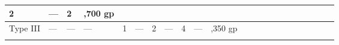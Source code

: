 \begin{longtable}{llllllllllllllllllllll}
{\begin{minipage}[t]{0.287in}
2\end{minipage}} & \multicolumn{1}{p{0.287in}|}{\begin{minipage}[t]{0.287in}\raggedright
---\end{minipage}} & \multicolumn{1}{p{0.287in}|}{\begin{minipage}[t]{0.287in}\raggedright
2\end{minipage}} & \multicolumn{1}{p{0.736in}|}{\begin{minipage}[t]{0.736in}\raggedleft
2,700 gp\end{minipage}}\\
\hline
\multicolumn{1}{p{0.054in}|}{\begin{minipage}[t]{0.054in}\raggedleft
Type III\end{minipage}} & \multicolumn{1}{p{0.054in}|}{\begin{minipage}[t]{0.054in}\centering
---\end{minipage}} & \multicolumn{1}{p{0.054in}|}{\begin{minipage}[t]{0.054in}\raggedright
---\end{minipage}} & \multicolumn{1}{p{0.054in}|}{\begin{minipage}[t]{0.054in}\raggedright
---\end{minipage}} & \multicolumn{1}{p{0.054in}|}{\begin{minipage}[t]{0.054in}\raggedright
1\end{minipage}} & \multicolumn{1}{p{0.054in}|}{\begin{minipage}[t]{0.054in}\raggedright
---\end{minipage}} & \multicolumn{1}{p{0.054in}|}{\begin{minipage}[t]{0.054in}\raggedright
2\end{minipage}} & \multicolumn{1}{p{0.054in}|}{\begin{minipage}[t]{0.054in}\raggedright
---\end{minipage}} & \multicolumn{1}{p{0.054in}|}{\begin{minipage}[t]{0.054in}\raggedright
4\end{minipage}} & \multicolumn{1}{p{0.054in}|}{\begin{minipage}[t]{0.054in}\raggedright
---\end{minipage}} & \multicolumn{1}{p{0.054in}|}{\begin{minipage}[t]{0.054in}\raggedleft
4,350 gp\end{minipage}}\\
\hline
\multicolumn{1}{|p{0.534in}|}{\begin{minipage}[t]{0.534in}\raggedleft

\end{minipage}}
\end{longtable}
